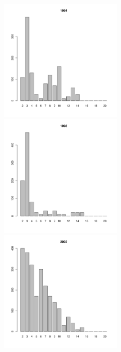 \begin{figure}[hp]
	\begin{minipage}[b]{.3\linewidth}
	\begin{center}
\includegraphics[width=60mm]{../White_Sea/Luvenga_Goreliy/high2_1994_.pdf}
	\end{center}
	\end{minipage}
	\hfill
	\begin{minipage}[b]{.3\linewidth}
	\begin{center}
	\includegraphics[width=60mm]{../White_Sea/Luvenga_Goreliy/high2_1998_.pdf}
	\end{center}
	\end{minipage}	
	\hfill
	\begin{minipage}[b]{.3\linewidth}
	\begin{center}
	\includegraphics[width=60mm]{../White_Sea/Luvenga_Goreliy/high2_2002_.pdf}
	\end{center}
	\end{minipage}


\end{figure}
